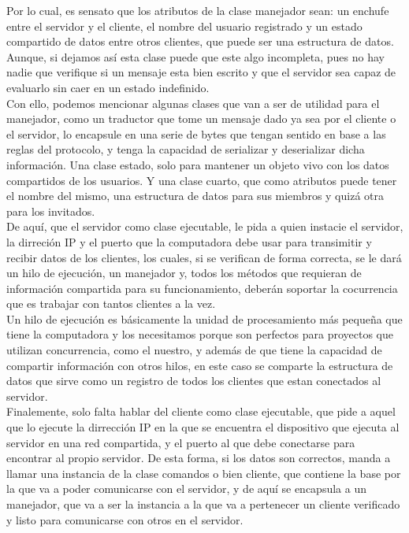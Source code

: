 \documentclass{article}
\begin{document}
Por lo cual, es sensato que los atributos de la clase manejador sean: un enchufe entre el servidor y el cliente, el nombre del usuario registrado y un estado compartido de datos entre otros clientes, que puede ser una estructura de datos. Aunque, si dejamos así esta clase puede que este algo incompleta, pues no hay nadie que verifique si un mensaje esta bien escrito y que el servidor sea capaz de evaluarlo sin caer en un estado indefinido.\\

Con ello, podemos mencionar algunas clases que van a ser de utilidad para el manejador, como un traductor que tome un mensaje dado ya sea por el cliente o el servidor, lo encapsule en una serie de bytes que tengan sentido en base a las reglas del protocolo, y tenga la capacidad de serializar y deserializar dicha información. Una clase estado, solo para mantener un objeto vivo con los datos compartidos de los usuarios. Y una clase cuarto, que como atributos puede tener el nombre del mismo, una estructura de datos para sus miembros y quizá otra para los invitados.\\

De aquí, que el servidor como clase ejecutable, le pida a quien instacie el servidor, la dirreción IP y el puerto que la computadora debe usar para transimitir y recibir datos de los clientes, los cuales, si se verifican de forma correcta, se le dará un hilo de ejecución, un manejador y, todos los métodos que requieran de información compartida para su funcionamiento, deberán soportar la cocurrencia que es trabajar con tantos clientes a la vez.\\

Un hilo de ejecución es básicamente la unidad de procesamiento más pequeña que tiene la computadora y los necesitamos porque son perfectos para proyectos que utilizan concurrencia, como el nuestro, y además de que tiene la capacidad de compartir información con otros hilos, en este caso se comparte la estructura de datos que sirve como un registro de todos los clientes que estan conectados al servidor.\\

Finalemente, solo falta hablar del cliente como clase ejecutable, que pide a aquel que lo ejecute la dirrección IP en la que se encuentra el dispositivo que ejecuta al servidor en una red compartida, y el puerto al que debe conectarse para encontrar al propio servidor. De esta forma, si los datos son correctos, manda a llamar una instancia de la clase comandos o bien cliente, que contiene la base por la que va a poder comunicarse con el servidor, y de aquí se encapsula a un manejador, que va a ser la instancia a la que va a pertenecer un cliente verificado y listo para comunicarse con otros en el servidor.\\
\end{document}
